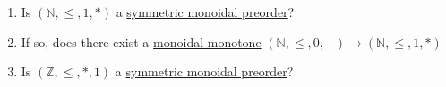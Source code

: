 \begin{enumerate}
    \item  Is $(\mathbb{N},\leq,1,*)$ a \hyperref[D2.2]{symmetric monoidal preorder}?
    \item If so, does there exist a \hyperref[D2.41]{monoidal monotone} $(\mathbb{N},\leq,0,+) \rightarrow (\mathbb{N},\leq,1,*)$
    \item Is $(\mathbb{Z},\leq,*,1)$ a \hyperref[D2.2]{symmetric monoidal preorder}?
  \end{enumerate}